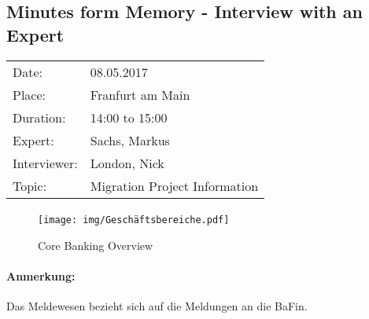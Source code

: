 \subsection*{Minutes form Memory  - Interview with an Expert}
\begin{tabular}{l l}
Date: & 08.05.2017 \\
Place: & Franfurt am Main \\
Duration: & 14:00 to 15:00 \\
Expert: & Sachs, Markus \\
Interviewer: & London, Nick \\
Topic: & Migration Project Information
\end{tabular}

\paragraph{}

\paragraph{}
\begin{figure}[H]
    \centering
    \texttt{[image: img/Geschäftsbereiche.pdf]}
    \captionsetup{labelformat=empty}
    \caption[]{Core Banking Overview}
    \label{fig:sbOver}
\end{figure}

\paragraph{Anmerkung:} Das Meldewesen bezieht sich auf die Meldungen an die BaFin.